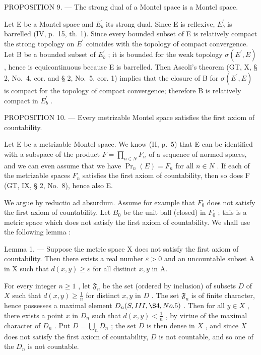 PROPOSITION 9. --- The strong dual of a Montel space is a Montel space.

Let E be a Montel space and \(E_{b}^{\prime}\) its strong dual. Since E is reflexive, \(E_{b}^{\prime}\) is barrelled (IV, p.~15, th. 1). Since every bounded subset of E is relatively compact the strong topology on \(E^{\prime}\) coincides with the topology of compact convergence. Let B be a bounded subset of \(E_{b}^{\prime}\) ; it is bounded for the weak topology \(\sigma(E^{\prime}, E)\) , hence is equicontinuous because E is barrelled. Then Ascoli's theorem (GT, X, § 2, No.~4, cor. and § 2, No.~5, cor. 1) implies that the closure of B for \(\sigma(E^{\prime}, E)\) is compact for the topology of compact convergence; therefore B is relatively compact in \(E_{b}^{\prime}\) .

PROPOSITION 10. --- Every metrizable Montel space satisfies the first axiom of countability.

Let E be a metrizable Montel space. We know (II, p.~5) that E can be identified with a subspace of the product \(F = \prod_{n \in N} F_n\) of a sequence of normed spaces, and we can even assume that we have \(\Pr_n(E) = F_n\) for all \(n \in N\) . If each of the metrizable spaces \(F_n\) satisfies the first axiom of countability, then so does F (GT, IX, § 2, No.~8), hence also E.

We argue by reductio ad absurdum. Assume for example that \(F_{0}\) does not satisfy the first axiom of countability. Let \(B_{0}\) be the unit ball (closed) in \(F_{0}\) ; this is a metric space which does not satisfy the first axiom of countability. We shall use the following lemma :

Lemma 1. --- Suppose the metric space X does not satisfy the first axiom of countability. Then there exists a real number \(\varepsilon > 0\) and an uncountable subset A in X such that \(d(x, y) \geqslant \varepsilon\) for all distinct \(x, y\) in A.

For every integer \(n \geqslant 1\) , let \(\mathfrak{F}_n\) be the set (ordered by inclusion) of subsets \(D\) of \(X\) such that \(d(x, y) \geqslant \frac{1}{n}\) for distinct \(x, y\) in \(D\) . The set \(\mathfrak{F}_n\) is of finite character, hence possesses a maximal element \(D_n(S, III, \S 4, No. 5)\) . Then for all \(y \in X\) , there exists a point \(x\) in \(D_n\) such that \(d(x, y) < \frac{1}{n}\) , by virtue of the maximal character of \(D_n\) . Put \(D = \bigcup_{n} D_n\) ; the set \(D\) is then dense in \(X\) , and since \(X\) does not satisfy the first axiom of countability, \(D\) is not countable, and so one of the \(D_n\) is not countable.

